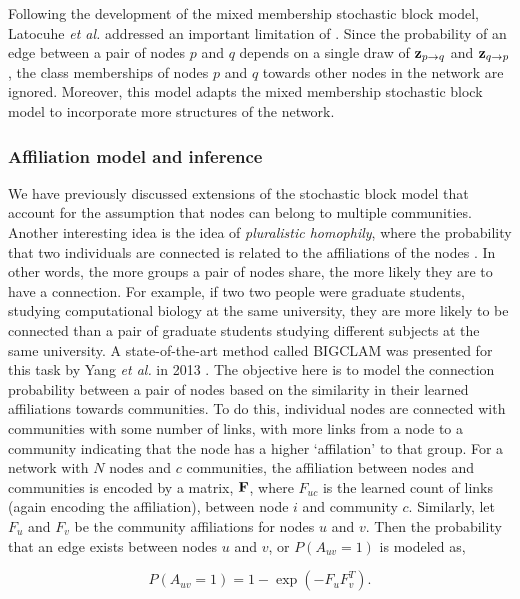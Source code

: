 Following the development of the mixed membership stochastic block model, Latocuhe \emph{et al.} \cite{LA} addressed an important limitation of \cite{mixMember}. Since the probability of an edge between a pair of nodes $p$ and $q$ depends on a single draw of ${\bf z}_{p\rightarrow q}$ and ${\bf z}_{q\rightarrow p}$, the class memberships of nodes $p$ and $q$ towards other nodes in the network are ignored. Moreover, this model adapts the mixed membership stochastic block model to incorporate more structures of the network. 

\subsubsection{Affiliation model and inference}

We have previously discussed extensions of the stochastic block model that account for the assumption that nodes can belong to multiple communities. Another interesting idea is the idea of \emph{pluralistic homophily}, where the probability that two individuals are connected is related to the affiliations of the nodes \cite{pluralHom}. In other words, the more groups a pair of nodes share, the more likely they are to have a connection. For example, if two two people were graduate students, studying computational biology at the same university, they are more likely to be connected than a pair of graduate students studying different subjects at the same university. A state-of-the-art method called BIGCLAM was presented for this task by Yang \emph{et al.} in 2013 \cite{bigclam}. The objective here is to model the connection probability between a pair of nodes based on the similarity in their learned affiliations towards communities. To do this, individual nodes are connected with communities with some number of links, with more links from a node to a community indicating that the node has a higher `affilation' to that group. For a network with $N$ nodes and $c$ communities, the affiliation between nodes and communities is encoded by a matrix, ${\bf F}$, where $F_{uc}$ is the learned count of links (again encoding the affiliation), between node $i$ and community $c$. Similarly, let $F_{u}$ and $F_{v}$ be the community affiliations for nodes $u$ and $v$. Then the probability that an edge exists between nodes $u$ and $v$, or $P(A_{uv}=1)$ is modeled as, 

\begin{equation}
P(A_{uv}=1)=1-\exp(-F_{u}F_{v}^{T}).
\label{eqAff}
\end{equation}

